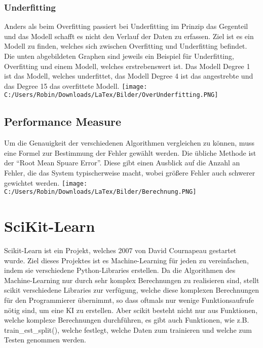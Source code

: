 \subsection{Underfitting}
\label{sec:underfitting}
Anders als beim Overfitting passiert bei Underfitting im Prinzip das Gegenteil und das Modell schafft es nicht den Verlauf der Daten zu erfassen.\cite[p.~214.]{WML}
Ziel ist es ein Modell zu finden, welches sich zwischen Overfitting und Underfitting befindet. Die unten abgebildeten Graphen sind jeweils ein Beispiel für Underfitting, Overfitting und einem Modell, welches erstrebenswert ist. Das Modell Degree 1 ist das Modell, welches underfittet, das Modell Degree 4 ist das angestrebte und das Degree 15 das overfittete Modell.
\newline
\texttt{[image: C:/Users/Robin/Downloads/LaTex/Bilder/OverUnderfitting.PNG]}


\section{Performance Measure}
\label{sec:performanceMeasure}
Um die Genauigkeit der verschiedenen Algorithmen vergleichen zu können, muss eine Formel zur Bestimmung der Fehler gewählt werden. 
Die übliche Methode ist der “Root Mean Spuare Error”. Diese gibt einen Ausblick auf die Anzahl an Fehler, die das System typischerweise macht, wobei größere Fehler auch schwerer gewichtet werden.\cite[p.~39.]{AG}
\newline
\texttt{[image: C:/Users/Robin/Downloads/LaTex/Bilder/Berechnung.PNG]}


\chapter{SciKit-Learn}
\label{chap:sciKitLearn}
Scikit-Learn ist ein Projekt, welches 2007 von David Cournapeau gestartet wurde.\cite{SKL} Ziel dieses Projektes ist es Machine-Learning für jeden zu vereinfachen, indem sie verschiedene Python-Libraries erstellen. Da die Algorithmen des Machine-Learning nur durch sehr komplex Berechnungen zu realisieren sind, stellt scikit verschiedene Libraries zur verfügung, welche diese komplexen Berechnungen für den Programmierer übernimmt, so dass oftmals nur wenige Funktionsaufrufe nötig sind, um eine KI zu erstellen. Aber scikit besteht nicht nur aus Funktionen, welche komplexe Berechnungen durchführen, es gibt auch Funktionen, wie z.B. train\_est\_split(), welche festlegt, welche Daten zum trainieren und welche zum Testen genommen werden.

